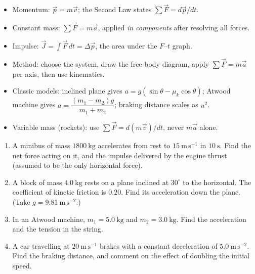 \documentclass[11pt]{article}
\begin{document}
\begin{aretenir}
\begin{itemize}
\item Momentum: $\vec{p}=m\vec{v}$; the Second Law states $\sum\vec{F} = d\vec{p}/dt$.
\item Constant mass: $\sum\vec{F}=m\vec{a}$, applied \emph{in components} after resolving all forces.
\item Impulse: $\vec{J}=\int\vec{F}\,dt=\Delta\vec{p}$, the area under the $F$--$t$ graph.
\item Method: choose the system, draw the free-body diagram, apply $\sum\vec{F}=m\vec{a}$ per axis, then use kinematics.
\item Classic models: inclined plane gives $a=g(\sin\theta-\mu_k\cos\theta)$; Atwood machine gives $a=\dfrac{(m_1-m_2)g}{m_1+m_2}$; braking distance scales as $u^2$.
\item Variable mass (rockets): use $\sum\vec{F}=d(m\vec{v})/dt$, never $m\vec{a}$ alone.
\end{itemize}
\end{aretenir}

\begin{exercice}[Practice]
\begin{enumerate}
\item A minibus of mass $1800\ \mathrm{kg}$ accelerates from rest to $15\ \mathrm{m\,s^{-1}}$ in $10\ \mathrm{s}$. Find the net force acting on it, and the impulse delivered by the engine thrust (assumed to be the only horizontal force).
\item A block of mass $4.0\ \mathrm{kg}$ rests on a plane inclined at $30^{\circ}$ to the horizontal. The coefficient of kinetic friction is $0.20$. Find its acceleration down the plane. (Take $g=9.81\ \mathrm{m\,s^{-2}}$.)
\item In an Atwood machine, $m_1 = 5.0\ \mathrm{kg}$ and $m_2 = 3.0\ \mathrm{kg}$. Find the acceleration and the tension in the string.
\item A car travelling at $20\ \mathrm{m\,s^{-1}}$ brakes with a constant deceleration of $5.0\ \mathrm{m\,s^{-2}}$. Find the braking distance, and comment on the effect of doubling the initial speed.
\end{enumerate}
\end{exercice}
\end{document}
